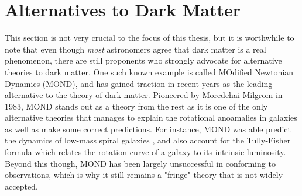 \section{Alternatives to Dark Matter}
This section is not very crucial to the focus of this thesis, but it is worthwhile to note that even though
\textit{most} astronomers agree that dark matter is a real phenomenon, there are still proponents who
strongly advocate for alternative theories to dark matter. One such known example is called MOdified
Newtonian Dynamics (MOND), and has gained traction in recent years as the leading alternative to the theory of
dark matter. Pioneered by Moredehai Milgrom in 1983, MOND stands out as a theory from the rest as it is one of 
the only alternative theories that manages to explain the rotational
anoamalies in galaxies as well as make some correct predictions. For instance, MOND was able predict the
dynamics of low-mass spiral galaxies \cite{milgromMONDRotationCurves2007}, and also account for the Tully-Fisher formula which relates the
rotation curve of a galaxy to its intrinsic luminosity. Beyond this though, MOND has been largely
unsuccessful in conforming to observations, which is why it still remains a "fringe" theory that is not
widely accepted. 
  
  
  
  



